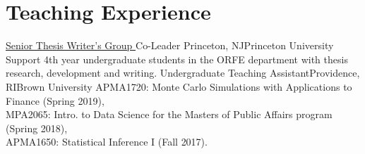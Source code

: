 \documentclass[10pt,a4paper,roman]{moderncv}        %
\begin{document}
\vspace{-0.2cm}
\section{Teaching Experience}
{\color{blue}\href{https://orfe.princeton.edu/undergraduate/stwg}{Senior Thesis
    Writer's Group }\color{black} Co-Leader}
{Princeton, NJ}{Princeton University}
{Support 4th year undergraduate students in the ORFE department with thesis research, development and writing.}
{Undergraduate Teaching Assistant}{Providence, RI}{Brown University}
{APMA1720: Monte Carlo Simulations with Applications to Finance (Spring 2019), \\
MPA2065: Intro. to Data Science for the Masters of Public Affairs program (Spring 2018),
\\
APMA1650: Statistical Inference I (Fall 2017).
}

\end{document}
